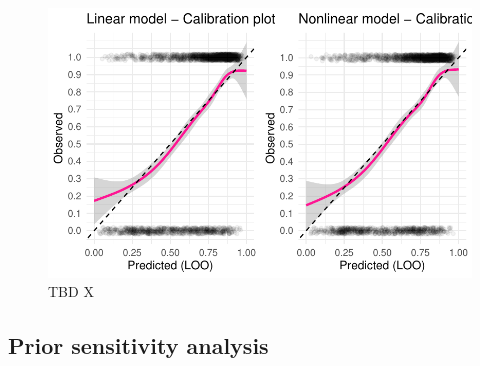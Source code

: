 \documentclass[
  letterpaper,
  DIV=11,
  numbers=noendperiod]{scrartcl}
\begin{document}
\begin{figure}[H]

{\centering \includegraphics{project_final_files/figure-pdf/Calibration plots-1.pdf}

}

\caption{TBD X}

\end{figure}

\hypertarget{prior-sensitivity-analysis}{%
\subsection{Prior sensitivity
analysis}\label{prior-sensitivity-analysis}}
\end{document}
